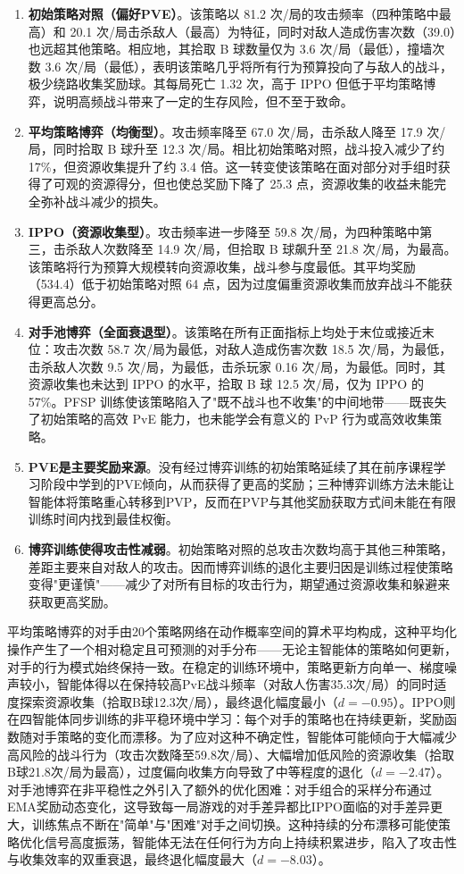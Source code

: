 \documentclass[12pt, a4paper, UTF8]{ctexart}
\numberwithin{equation}{section}
\begin{document}
\begin{enumerate}[label=(\arabic*)]
  \item \textbf{初始策略对照（偏好PVE）}。该策略以 81.2 次/局的攻击频率（四种策略中最高）和 20.1 次/局击杀敌人（最高）为特征，同时对敌人造成伤害次数（39.0）也远超其他策略。相应地，其拾取 B 球数量仅为 3.6 次/局（最低），撞墙次数 3.6 次/局（最低），表明该策略几乎将所有行为预算投向了与敌人的战斗，极少绕路收集奖励球。其每局死亡 1.32 次，高于 IPPO 但低于平均策略博弈，说明高频战斗带来了一定的生存风险，但不至于致命。
  \item \textbf{平均策略博弈（均衡型）}。攻击频率降至 67.0 次/局，击杀敌人降至 17.9 次/局，同时拾取 B 球升至 12.3 次/局。相比初始策略对照，战斗投入减少了约 17\%，但资源收集提升了约 3.4 倍。这一转变使该策略在面对部分对手组时获得了可观的资源得分，但也使总奖励下降了 25.3 点，资源收集的收益未能完全弥补战斗减少的损失。
  \item \textbf{IPPO（资源收集型）}。攻击频率进一步降至 59.8 次/局，为四种策略中第三，击杀敌人次数降至 14.9 次/局，但拾取 B 球飙升至 21.8 次/局，为最高。该策略将行为预算大规模转向资源收集，战斗参与度最低。其平均奖励（534.4）低于初始策略对照 64 点，因为过度偏重资源收集而放弃战斗不能获得更高总分。
  \item \textbf{对手池博弈（全面衰退型）}。该策略在所有正面指标上均处于末位或接近末位：攻击次数 58.7 次/局为最低，对敌人造成伤害次数 18.5 次/局，为最低，击杀敌人次数 9.5 次/局，为最低，击杀玩家 0.16 次/局，为最低。同时，其资源收集也未达到 IPPO 的水平，拾取 B 球 12.5 次/局，仅为 IPPO 的 57\%。PFSP 训练使该策略陷入了"既不战斗也不收集"的中间地带——既丧失了初始策略的高效 PvE 能力，也未能学会有意义的 PvP 行为或高效收集策略。
  \item \textbf{PVE是主要奖励来源}。没有经过博弈训练的初始策略延续了其在前序课程学习阶段中学到的PVE倾向，从而获得了更高的奖励；三种博弈训练方法未能让智能体将策略重心转移到PVP，反而在PVP与其他奖励获取方式间未能在有限训练时间内找到最佳权衡。
  \item \textbf{博弈训练使得攻击性减弱}。初始策略对照的总攻击次数均高于其他三种策略，差距主要来自对敌人的攻击。因而博弈训练的退化主要归因是训练过程使策略变得"更谨慎"——减少了对所有目标的攻击行为，期望通过资源收集和躲避来获取更高奖励。
\end{enumerate}

平均策略博弈的对手由20个策略网络在动作概率空间的算术平均构成，这种平均化操作产生了一个相对稳定且可预测的对手分布——无论主智能体的策略如何更新，对手的行为模式始终保持一致。在稳定的训练环境中，策略更新方向单一、梯度噪声较小，智能体得以在保持较高PvE战斗频率（对敌人伤害35.3次/局）的同时适度探索资源收集（拾取B球12.3次/局），最终退化幅度最小（$d=-0.95$）。IPPO则在四智能体同步训练的非平稳环境中学习：每个对手的策略也在持续更新，奖励函数随对手策略的变化而漂移。为了应对这种不确定性，智能体可能倾向于大幅减少高风险的战斗行为（攻击次数降至59.8次/局）、大幅增加低风险的资源收集（拾取B球21.8次/局为最高），过度偏向收集方向导致了中等程度的退化（$d=-2.47$）。对手池博弈在非平稳性之外引入了额外的优化困难：对手组合的采样分布通过EMA奖励动态变化，这导致每一局游戏的对手差异都比IPPO面临的对手差异更大，训练焦点不断在"简单"与"困难"对手之间切换。这种持续的分布漂移可能使策略优化信号高度振荡，智能体无法在任何行为方向上持续积累进步，陷入了攻击性与收集效率的双重衰退，最终退化幅度最大（$d=-8.03$）。
\end{document}
